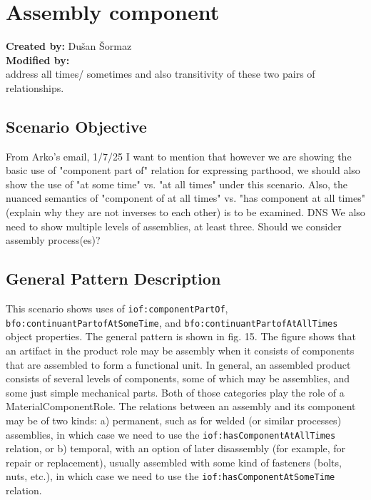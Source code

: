 \section{Assembly component}

\textbf{Created by:} Dušan Šormaz \\
\textbf{Modified by:}  \\

address all times/ sometimes and also transitivity of these two pairs of relationships.

\subsection*{Scenario Objective}
From Arko's email, 1/7/25 
I want to mention that however we are showing the basic use of "component part of" relation for expressing parthood, we should also show the use of "at some time" vs. "at all times" under this scenario. Also, the nuanced semantics of "component of at all times" vs. "has component at all times" (explain why they are not inverses to each other) is to be examined.
DNS
We also need to show multiple levels of assemblies, at least three. Should we consider assembly process(es)?
\subsection*{General Pattern Description}
This scenario shows uses of \texttt{iof:componentPartOf}, \texttt{bfo:continuantPartofAtSomeTime}, and \texttt{bfo:continuantPartofAtAllTimes} object properties. The general pattern is shown in fig. 15. The figure shows that an artifact in the product role may be assembly when it consists of components that are assembled to form a functional unit. In general, an assembled product consists of several levels of components, some of which may be assemblies, and some just simple mechanical parts. Both of those categories play the role of a MaterialComponentRole. The relations between an assembly and its component may be of two kinds: a) permanent, such as for welded (or similar processes) assemblies, in which case we need to use the \texttt{iof:hasComponentAtAllTimes} relation, or b) temporal, with an option of later disassembly (for example, for repair or replacement), usually assembled with some  kind of fasteners (bolts, nuts, etc.), in which case we need to use the \texttt{iof:hasComponentAtSomeTime} relation.

